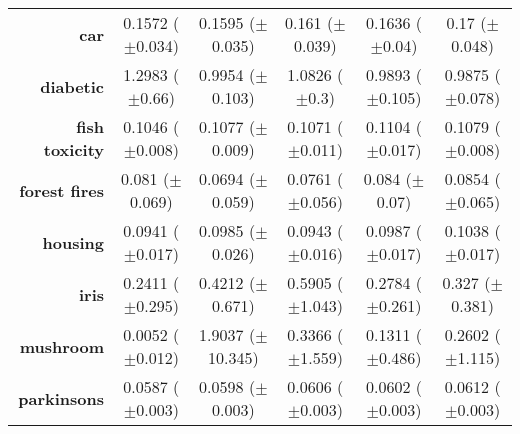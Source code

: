 \begin{table}[htb]
{\begin{tabular}{r|ccccc}
			\textbf{car}                 & \cellcolor[rgb]{ .388,  .745,  .482}0.1572 ($\pm$0.034)     & \cellcolor[rgb]{ .757,  .851,  .502}0.1595 ($\pm$0.035) & \cellcolor[rgb]{ 1,  .922,  .518}0.161 ($\pm$0.039)     & \cellcolor[rgb]{ .992,  .773,  .49}0.1636 ($\pm$0.04)  & \cellcolor[rgb]{ .973,  .412,  .42}0.17 ($\pm$0.048)    \\
			\textbf{diabetic}            & \cellcolor[rgb]{ .973,  .412,  .42}1.2983 ($\pm$0.66)       & \cellcolor[rgb]{ 1,  .922,  .518}0.9954 ($\pm$0.103)    & \cellcolor[rgb]{ .992,  .776,  .49}1.0826 ($\pm$0.3)    & \cellcolor[rgb]{ .525,  .784,  .49}0.9893 ($\pm$0.105) & \cellcolor[rgb]{ .388,  .745,  .482}0.9875 ($\pm$0.078) \\
			\textbf{fish toxicity}       & \cellcolor[rgb]{ .388,  .745,  .482}0.1046 ($\pm$0.008)     & \cellcolor[rgb]{ 1,  .922,  .518}0.1077 ($\pm$0.009)    & \cellcolor[rgb]{ .882,  .886,  .51}0.1071 ($\pm$0.011)  & \cellcolor[rgb]{ .973,  .412,  .42}0.1104 ($\pm$0.017) & \cellcolor[rgb]{ 1,  .886,  .514}0.1079 ($\pm$0.008)    \\
			\textbf{forest fires}        & \cellcolor[rgb]{ 1,  .922,  .518}0.081 ($\pm$0.069)         & \cellcolor[rgb]{ .388,  .745,  .482}0.0694 ($\pm$0.059) & \cellcolor[rgb]{ .737,  .843,  .502}0.0761 ($\pm$0.056) & \cellcolor[rgb]{ .984,  .569,  .451}0.084 ($\pm$0.07)  & \cellcolor[rgb]{ .973,  .412,  .42}0.0854 ($\pm$0.065)  \\
			\textbf{housing}             & \cellcolor[rgb]{ .388,  .745,  .482}0.0941 ($\pm$0.017)     & \cellcolor[rgb]{ 1,  .922,  .518}0.0985 ($\pm$0.026)    & \cellcolor[rgb]{ .412,  .749,  .482}0.0943 ($\pm$0.016) & \cellcolor[rgb]{ 1,  .906,  .518}0.0987 ($\pm$0.017)   & \cellcolor[rgb]{ .973,  .412,  .42}0.1038 ($\pm$0.017)  \\
			\textbf{iris}                & \cellcolor[rgb]{ .388,  .745,  .482}0.2411 ($\pm$0.295)     & \cellcolor[rgb]{ .992,  .741,  .486}0.4212 ($\pm$0.671) & \cellcolor[rgb]{ .973,  .412,  .42}0.5905 ($\pm$1.043)  & \cellcolor[rgb]{ .651,  .82,  .494}0.2784 ($\pm$0.261) & \cellcolor[rgb]{ 1,  .922,  .518}0.327 ($\pm$0.381)     \\
			\textbf{mushroom}            & \cellcolor[rgb]{ .388,  .745,  .482}0.0052 ($\pm$0.012)     & \cellcolor[rgb]{ .973,  .412,  .42}1.9037 ($\pm$10.345) & \cellcolor[rgb]{ 1,  .898,  .514}0.3366 ($\pm$1.559)    & \cellcolor[rgb]{ .69,  .831,  .498}0.1311 ($\pm$0.486) & \cellcolor[rgb]{ 1,  .922,  .518}0.2602 ($\pm$1.115)    \\
			\textbf{parkinsons}          & \cellcolor[rgb]{ .388,  .745,  .482}0.0587 ($\pm$0.003)     & \cellcolor[rgb]{ .82,  .867,  .506}0.0598 ($\pm$0.003)  & \cellcolor[rgb]{ .988,  .694,  .475}0.0606 ($\pm$0.003) & \cellcolor[rgb]{ 1,  .922,  .518}0.0602 ($\pm$0.003)   & \cellcolor[rgb]{ .973,  .412,  .42}0.0612 ($\pm$0.003)  \\

\end{tabular}}
\end{table}
